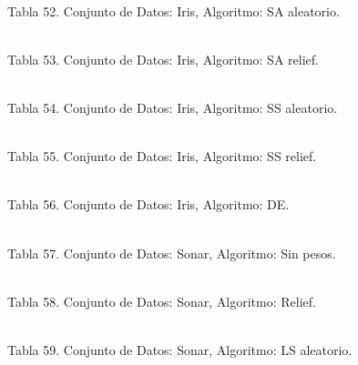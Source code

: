\documentclass{ci5652}
\begin{document}
\begin{adjustbox}{width=\columnwidth, center=\columnwidth}
%
\\
\end{adjustbox}
Tabla 52. Conjunto de Datos: Iris, Algoritmo: SA aleatorio.

\begin{adjustbox}{width=\columnwidth, center=\columnwidth}
%
\\
\end{adjustbox}
Tabla 53. Conjunto de Datos: Iris, Algoritmo: SA relief.

\begin{adjustbox}{width=\columnwidth, center=\columnwidth}
%
\\
\end{adjustbox}
Tabla 54. Conjunto de Datos: Iris, Algoritmo: SS aleatorio.

\begin{adjustbox}{width=\columnwidth, center=\columnwidth}
%
\\
\end{adjustbox}
Tabla 55. Conjunto de Datos: Iris, Algoritmo: SS relief.

\begin{adjustbox}{width=\columnwidth, center=\columnwidth}
%
\\
\end{adjustbox}
Tabla 56. Conjunto de Datos: Iris, Algoritmo: DE.

%
\\
Tabla 57. Conjunto de Datos: Sonar, Algoritmo: Sin pesos.

%
\\
Tabla 58. Conjunto de Datos: Sonar, Algoritmo: Relief.

%
\\
Tabla 59. Conjunto de Datos: Sonar, Algoritmo: LS aleatorio.
\end{document}

